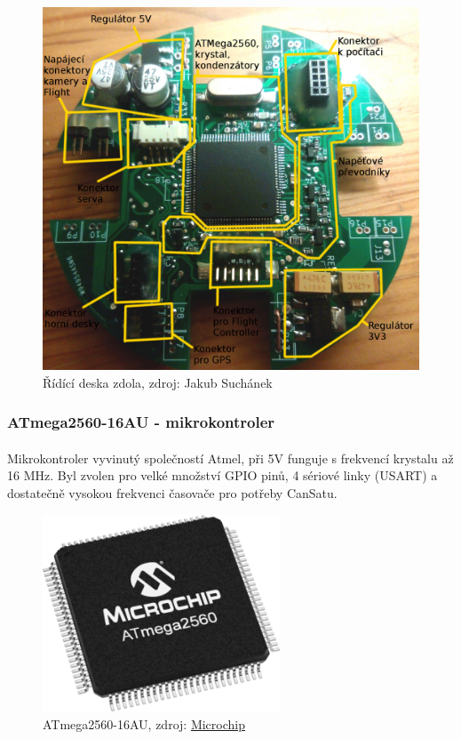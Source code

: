 \documentclass[a4paper]{report}
\begin{document}
\begin{figure}[H]
\centering
\caption{Řídící deska zdola, zdroj: Jakub Suchánek}
\includegraphics[width=400pt]{main2.jpg}
\end{figure}
\subsubsection{ATmega2560-16AU - mikrokontroler}
\paragraph{} Mikrokontroler vyvinutý společností Atmel, při 5V funguje s frekvencí krystalu až 16 MHz. Byl zvolen pro velké množství GPIO pinů, 4 sériové linky (USART) a dostatečně vysokou frekvenci časovače pro potřeby CanSatu.
\begin{figure}[H]
\caption{ATmega2560-16AU, zdroj: \href{https://www.microchip.com/_images/ics/medium-ATmega2560-TQFP-100.png}{Microchip}}
\centering
\includegraphics[width=200pt]{ATmega2560.png}
\end{figure}
\end{document}
